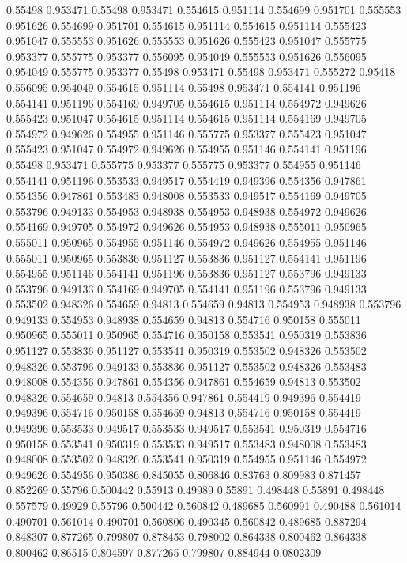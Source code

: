 0.55498 0.953471
0.55498 0.953471
0.554615 0.951114
0.554699 0.951701
0.555553 0.951626
0.554699 0.951701
0.554615 0.951114
0.554615 0.951114
0.555423 0.951047
0.555553 0.951626
0.555553 0.951626
0.555423 0.951047
0.555775 0.953377
0.555775 0.953377
0.556095 0.954049
0.555553 0.951626
0.556095 0.954049
0.555775 0.953377
0.55498 0.953471
0.55498 0.953471
0.555272 0.95418
0.556095 0.954049
0.554615 0.951114
0.55498 0.953471
0.554141 0.951196
0.554141 0.951196
0.554169 0.949705
0.554615 0.951114
0.554972 0.949626
0.555423 0.951047
0.554615 0.951114
0.554615 0.951114
0.554169 0.949705
0.554972 0.949626
0.554955 0.951146
0.555775 0.953377
0.555423 0.951047
0.555423 0.951047
0.554972 0.949626
0.554955 0.951146
0.554141 0.951196
0.55498 0.953471
0.555775 0.953377
0.555775 0.953377
0.554955 0.951146
0.554141 0.951196
0.553533 0.949517
0.554419 0.949396
0.554356 0.947861
0.554356 0.947861
0.553483 0.948008
0.553533 0.949517
0.554169 0.949705
0.553796 0.949133
0.554953 0.948938
0.554953 0.948938
0.554972 0.949626
0.554169 0.949705
0.554972 0.949626
0.554953 0.948938
0.555011 0.950965
0.555011 0.950965
0.554955 0.951146
0.554972 0.949626
0.554955 0.951146
0.555011 0.950965
0.553836 0.951127
0.553836 0.951127
0.554141 0.951196
0.554955 0.951146
0.554141 0.951196
0.553836 0.951127
0.553796 0.949133
0.553796 0.949133
0.554169 0.949705
0.554141 0.951196
0.553796 0.949133
0.553502 0.948326
0.554659 0.94813
0.554659 0.94813
0.554953 0.948938
0.553796 0.949133
0.554953 0.948938
0.554659 0.94813
0.554716 0.950158
0.555011 0.950965
0.555011 0.950965
0.554716 0.950158
0.553541 0.950319
0.553836 0.951127
0.553836 0.951127
0.553541 0.950319
0.553502 0.948326
0.553502 0.948326
0.553796 0.949133
0.553836 0.951127
0.553502 0.948326
0.553483 0.948008
0.554356 0.947861
0.554356 0.947861
0.554659 0.94813
0.553502 0.948326
0.554659 0.94813
0.554356 0.947861
0.554419 0.949396
0.554419 0.949396
0.554716 0.950158
0.554659 0.94813
0.554716 0.950158
0.554419 0.949396
0.553533 0.949517
0.553533 0.949517
0.553541 0.950319
0.554716 0.950158
0.553541 0.950319
0.553533 0.949517
0.553483 0.948008
0.553483 0.948008
0.553502 0.948326
0.553541 0.950319
0.554955 0.951146
0.554972 0.949626
0.554956 0.950386
0.845055 0.806846
0.83763 0.809983
0.871457 0.852269
0.55796 0.500442
0.55913 0.49989
0.55891 0.498448
0.55891 0.498448
0.557579 0.49929
0.55796 0.500442
0.560842 0.489685
0.560991 0.490488
0.561014 0.490701
0.561014 0.490701
0.560806 0.490345
0.560842 0.489685
0.887294 0.848307
0.877265 0.799807
0.878453 0.798002
0.864338 0.800462
0.864338 0.800462
0.86515 0.804597
0.877265 0.799807
0.884944 0.0802309
